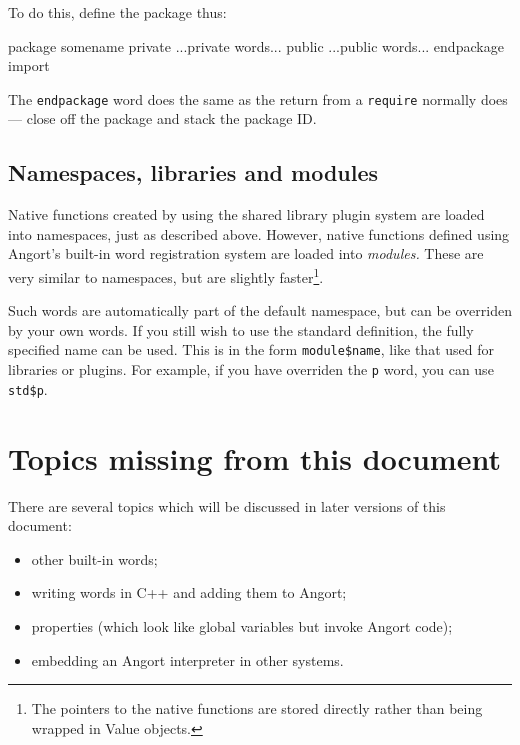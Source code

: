 To do this, define the package thus:
\begin{v}
package somename
private
...private words...
public
...public words...
endpackage import
\end{v}
The \texttt{endpackage} word does the same as the return from a 
\texttt{require} normally does --- close off the package and
stack the package ID.

\subsection{Namespaces, libraries and modules}
Native functions created by using the shared library plugin system
are loaded into namespaces, just as described above. However, native
functions defined using Angort's built-in word registration system
are loaded into \emph{modules.} These are very similar to namespaces,
but are slightly faster\footnote{The pointers to the native functions
are stored directly rather than being wrapped in Value objects.}. 

Such words are automatically part of the default namespace, but can
be overriden by your own words. If you still wish to use the standard
definition, the fully specified name can be used. This is in the form
\verb+module$name+, like that used for libraries or plugins. For example,
if you have overriden the \texttt{p} word, you can use \verb+std$p+.





\section{Topics missing from this document}
There are several topics which will be discussed in later versions
of this document:
\begin{itemize}
\item other built-in words;
\item writing words in C++ and adding them to Angort;
\item properties (which look like global variables but invoke Angort code);
\item embedding an Angort interpreter in other systems.
\end{itemize}




